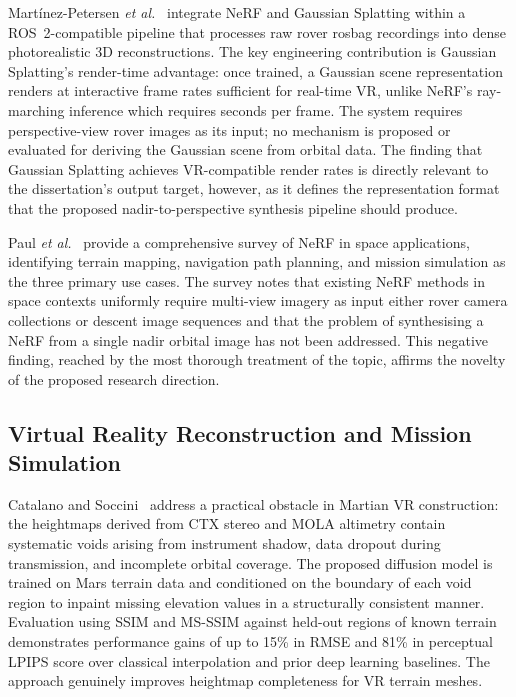 \documentclass[10pt,journal]{IEEEtran}
\begin{document}
Mart{\'i}nez-Petersen \textit{et al.}~\cite{martinezpetersen2025hifi} integrate
NeRF and Gaussian Splatting within a ROS~2-compatible pipeline that processes
raw rover rosbag recordings into dense photorealistic 3D reconstructions. The
key engineering contribution is Gaussian Splatting's render-time advantage: once
trained, a Gaussian scene representation renders at interactive frame rates
sufficient for real-time VR, unlike NeRF's ray-marching inference which requires
seconds per frame. The system requires perspective-view rover images as its
input; no mechanism is proposed or evaluated for deriving the Gaussian scene
from orbital data. The finding that Gaussian Splatting achieves VR-compatible
render rates is directly relevant to the dissertation's output target, however,
as it defines the representation format that the proposed nadir-to-perspective
synthesis pipeline should produce.

Paul \textit{et al.}~\cite{paul2025nerfspace} provide a comprehensive survey of
NeRF in space applications, identifying terrain mapping, navigation path planning,
and mission simulation as the three primary use cases. The survey notes that
existing NeRF methods in space contexts uniformly require multi-view imagery as
input either rover camera collections or descent image sequences and that the
problem of synthesising a NeRF from a single nadir orbital image has not been
addressed. This negative finding, reached by the most thorough treatment of the
topic, affirms the novelty of the proposed research direction.

\subsection{Virtual Reality Reconstruction and Mission Simulation}
\label{subsec:vr}

Catalano and Soccini~\cite{catalano2025inpainting} address a practical obstacle
in Martian VR construction: the heightmaps derived from CTX stereo and MOLA
altimetry contain systematic voids arising from instrument shadow, data dropout
during transmission, and incomplete orbital coverage. The proposed diffusion
model is trained on Mars terrain data and conditioned on the boundary of each
void region to inpaint missing elevation values in a structurally consistent
manner. Evaluation using SSIM and MS-SSIM against held-out regions of known
terrain demonstrates performance gains of up to 15\% in RMSE and 81\% in
perceptual LPIPS score over classical interpolation and prior deep learning
baselines. The approach genuinely improves heightmap completeness for VR terrain
meshes.
\end{document}
